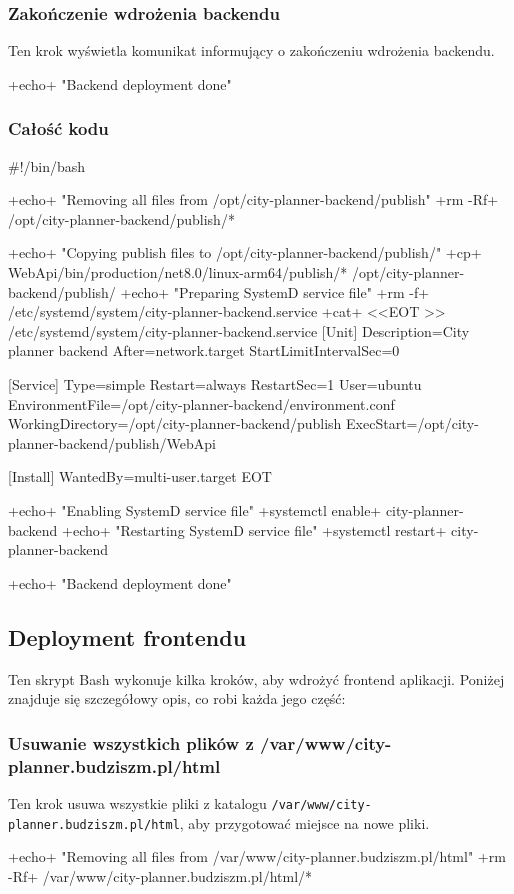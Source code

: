 \subsubsection{Zakończenie wdrożenia backendu}
Ten krok wyświetla komunikat informujący o zakończeniu wdrożenia backendu.
\begin{longlisting}[style=shell-colored,label={lst:db6}]
+echo+ "Backend deployment done"
\end{longlisting}

\subsubsection{Całość kodu}
\begin{longlisting}[style=shell-colored,label={lst:db7}]
#!/bin/bash

+echo+ "Removing all files from /opt/city-planner-backend/publish"
+rm -Rf+ /opt/city-planner-backend/publish/*

+echo+ "Copying publish files to /opt/city-planner-backend/publish/"
+cp+ WebApi/bin/production/net8.0/linux-arm64/publish/* /opt/city-planner-backend/publish/
+echo+ "Preparing SystemD service file"
+rm -f+ /etc/systemd/system/city-planner-backend.service
+cat+ <<EOT >> /etc/systemd/system/city-planner-backend.service
[Unit]
Description=City planner backend
After=network.target
StartLimitIntervalSec=0

[Service]
Type=simple
Restart=always
RestartSec=1
User=ubuntu
EnvironmentFile=/opt/city-planner-backend/environment.conf
WorkingDirectory=/opt/city-planner-backend/publish
ExecStart=/opt/city-planner-backend/publish/WebApi

[Install]
WantedBy=multi-user.target
EOT

+echo+ "Enabling SystemD service file"
+systemctl enable+ city-planner-backend
+echo+ "Restarting SystemD service file"
+systemctl restart+ city-planner-backend

+echo+ "Backend deployment done"
\end{longlisting}

\subsection{Deployment frontendu}
Ten skrypt Bash wykonuje kilka kroków, aby wdrożyć frontend aplikacji.
Poniżej znajduje się szczegółowy opis, co robi każda jego część:

\subsubsection{Usuwanie wszystkich plików z \newline
/var/www/city-planner.budziszm.pl/html}
Ten krok usuwa wszystkie pliki z katalogu \texttt{/var/www/city-planner.budziszm.pl/html}, aby przygotować miejsce na nowe pliki.
\begin{longlisting}[style=shell-colored]
+echo+ "Removing all files from /var/www/city-planner.budziszm.pl/html"
+rm -Rf+ /var/www/city-planner.budziszm.pl/html/*
\end{longlisting}

